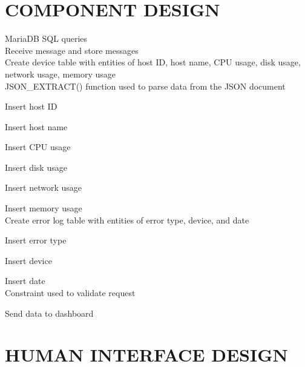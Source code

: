 \documentclass[letterpaper,12pt,oneside,listof=totoc]{scrreprt}
\begin{document}
\chapter{COMPONENT DESIGN}

MariaDB SQL queries\\

Receive message and store messages\\

Create device table with entities of host ID, host name, CPU usage, disk usage, network usage, memory usage\\

JSON_EXTRACT() function used to parse data from the JSON document 

Insert host ID

Insert host name

Insert CPU usage

Insert disk usage

Insert network usage 

Insert memory usage\\


Create error log table with entities of error type, device, and date

Insert error type 

Insert device 

Insert date\\




Constraint used to validate request 

Send data to dashboard 






\chapter{HUMAN INTERFACE DESIGN}
\end{document}
